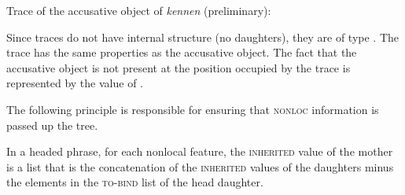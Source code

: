 \eas
\label{le-spur-acc-o-kennen}
Trace of the accusative object of \emph{kennen} (preliminary):\\
\zs

\noindent
Since traces do not have internal structure (no daughters), they are of type .
The trace has the same properties as the accusative object. The fact that the accusative object is not present at the position occupied by the trace
is represented by the value of \slasch. 
%

The following principle is responsible for ensuring that \textsc{nonloc} information is passed up the tree.

\begin{samepage}
\begin{principle-break}
\label{Prinzip-der-Nichtlokalen-Merkmale}
In a headed phrase, for each nonlocal feature, the \textsc{inherited} value of the mother is a list
that is the concatenation of the \textsc{inherited} values of the daughters minus the elements in the
\textsc{to-bind} list of the head daughter.
\end{principle-break}
\end{samepage}

